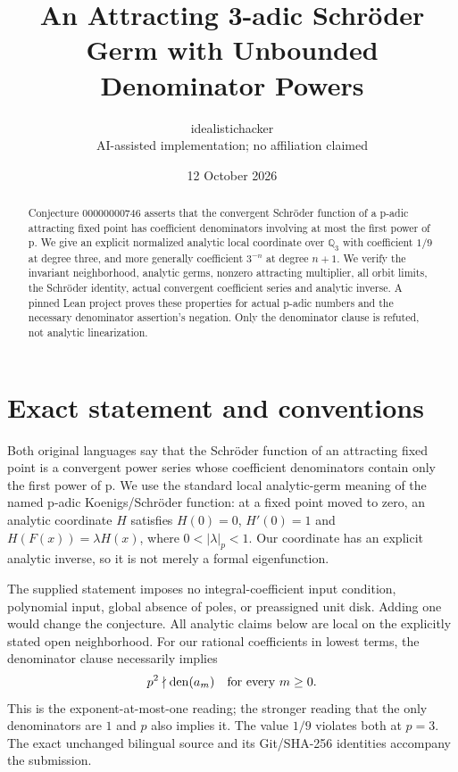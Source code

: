 \documentclass[10pt,a4paper]{article}
\title{An Attracting 3-adic Schr\"oder Germ with Unbounded Denominator Powers}
\author{idealistichacker\\\small AI-assisted implementation; no affiliation claimed}
\date{12 October 2026}
\newcommand{\Q}{\mathbb Q}
\begin{document}
\maketitle
\begin{abstract}
Conjecture 00000000746 asserts that the convergent Schr\"oder function of a p-adic attracting
fixed point has coefficient denominators involving at most the first power of p. We give an
explicit normalized analytic local coordinate over $\Q_3$ with coefficient $1/9$ at degree
three, and more generally coefficient $3^{-n}$ at degree $n+1$. We verify the invariant
neighborhood, analytic germs, nonzero attracting multiplier, all orbit limits, the
Schr\"oder identity, actual convergent coefficient series and analytic inverse. A pinned Lean
project proves these properties for actual p-adic numbers and the necessary denominator
assertion's negation. Only the denominator clause is refuted, not analytic linearization.
\end{abstract}

\section{Exact statement and conventions}
Both original languages say that the Schr\"oder function of an attracting fixed point is a
convergent power series whose coefficient denominators contain only the first power of p.
We use the standard local analytic-germ meaning of the named p-adic Koenigs/Schr\"oder
function: at a fixed point moved to zero, an analytic coordinate $H$ satisfies
$H(0)=0$, $H'(0)=1$ and $H(F(x))=\lambda H(x)$, where $0<|\lambda|_p<1$.
Our coordinate has an explicit analytic inverse, so it is not merely a formal eigenfunction.

The supplied statement imposes no integral-coefficient input condition, polynomial input,
global absence of poles, or preassigned unit disk. Adding one would change the conjecture.
All analytic claims below are local on the explicitly stated open neighborhood.
For our rational coefficients in lowest terms, the denominator clause necessarily implies
\begin{equation}\label{eq:bound}
 p^2\nmid\operatorname{den}(a_m)\quad\hbox{for every }m\ge0.
\end{equation}
This is the exponent-at-most-one reading; the stronger reading that the only denominators
are $1$ and $p$ also implies it. The value $1/9$ violates both at $p=3$.
The exact unchanged bilingual source and its Git/SHA-256 identities accompany the submission.
\end{document}
